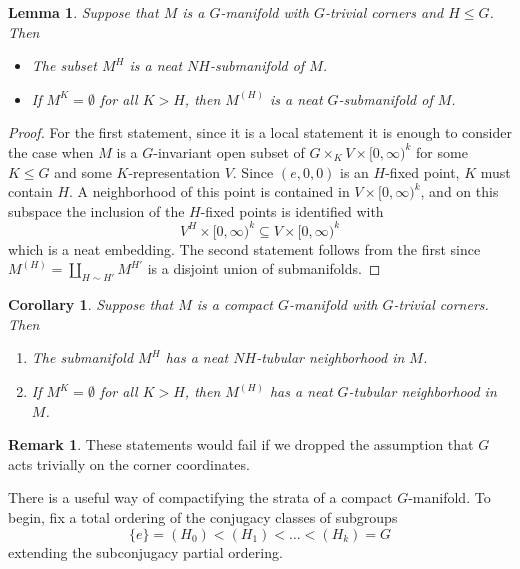 \documentclass[11pt]{amsart}
\newtheorem{cor}{Corollary}[section]
\newtheorem{lem}{Lemma}[section]
\theoremstyle{definition}
\newtheorem{rem}{Remark}[section]
\numberwithin{equation}{section}
\numberwithin{figure}{section}
\begin{document}
\begin{lem}
Suppose that $M$ is a $G$-manifold with $G$-trivial corners and $H \leq G$. Then
	\begin{itemize}
		\item The subset $M^H$ is a neat $NH$-submanifold of $M$.
		\item If $M^K = \emptyset$ for all $K > H$, then $M^{(H)}$ is a neat $G$-submanifold of $M$.
	\end{itemize}
\end{lem}


\begin{proof}
	For the first statement, since it is a local statement it is enough to consider the case when $M$ is a $G$-invariant open subset of $G \times_K V \times [0,\infty)^k$ for some $K\le G$ and some $K$-representation $V$. Since $(e,0,0)$ is an $H$-fixed point, $K$ must contain $H$. A neighborhood of this point is contained in $V \times [0,\infty)^k$, and on this subspace the inclusion of the $H$-fixed points is identified with
	\[ V^H \times [0,\infty)^k \subseteq V \times [0,\infty)^k \]
which is a neat embedding.
The second statement follows from the first since $M^{(H)} = \coprod_{H\sim H'} M^{H'}$ is a disjoint union of submanifolds.
\end{proof}


\begin{cor}\label{tubular_nbhd_of_fixed_pts}
Suppose that $M$ is a compact $G$-manifold with $G$-trivial corners. Then
	\begin{enumerate}
		\item The submanifold $M^H$ has a neat $NH$-tubular neighborhood in $M$.
		\item If $M^K = \emptyset$ for all $K > H$,  then $M^{(H)}$ has a neat $G$-tubular neighborhood in $M$.
	\end{enumerate}
\end{cor}

\begin{rem}
	These statements would fail if we dropped the assumption that $G$ acts trivially on the corner coordinates.
\end{rem}

There is a useful way of compactifying the strata of a compact $G$-manifold. To begin, fix a total ordering of the conjugacy classes of subgroups
$$ \{e\} =(H_0) < (H_1) < \ldots < (H_k) = G$$
extending the subconjugacy partial ordering.
\end{document}
